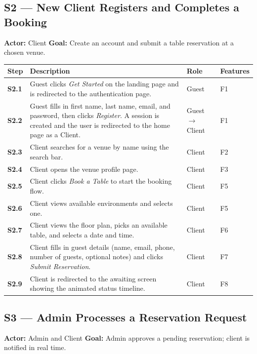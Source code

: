 \documentclass[12pt,a4paper,oneside]{report}
\begin{document}
\subsection*{S2 --- New Client Registers and Completes a Booking}
\begin{mdframed}[style=scenariobox]
\textbf{Actor:} Client \quad
\textbf{Goal:} Create an account and submit a table reservation at a
chosen venue.
\end{mdframed}

\begin{longtable}{>{\bfseries}l L{6.2cm} l L{2.8cm}}
  \toprule
  Step & Description & Role & Features \\
  \midrule
  S2.1 & Guest clicks \emph{Get Started} on the landing page and is redirected
         to the authentication page. & Guest & F1 \\
  S2.2 & Guest fills in first name, last name, email, and password, then clicks
         \emph{Register}. A session is created and the user is redirected to the
         home page as a Client. & Guest $\to$ Client & F1 \\
  S2.3 & Client searches for a venue by name using the search bar. & Client & F2 \\
  S2.4 & Client opens the venue profile page. & Client & F3 \\
  S2.5 & Client clicks \emph{Book a Table} to start the booking flow. & Client & F5 \\
  S2.6 & Client views available environments and selects one. & Client & F5 \\
  S2.7 & Client views the floor plan, picks an available table, and selects a
         date and time. & Client & F6 \\
  S2.8 & Client fills in guest details (name, email, phone, number of guests,
         optional notes) and clicks \emph{Submit Reservation}. & Client & F7 \\
  S2.9 & Client is redirected to the awaiting screen showing the animated status
         timeline. & Client & F8 \\
  \bottomrule
\end{longtable}

\subsection*{S3 --- Admin Processes a Reservation Request}
\begin{mdframed}[style=scenariobox]
\textbf{Actor:} Admin and Client \quad
\textbf{Goal:} Admin approves a pending reservation; client is notified in
real time.
\end{mdframed}
\end{document}
